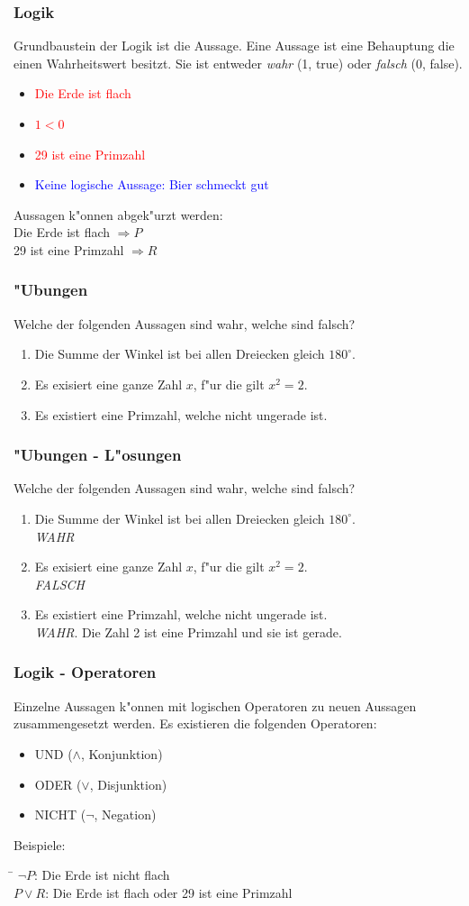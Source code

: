 \documentclass{beamer}
\begin{document}
\frame
{
	\frametitle{Logik}
	Grundbaustein der Logik ist die Aussage. Eine Aussage ist eine Behauptung die einen
	Wahrheitswert besitzt. Sie ist entweder \emph{wahr} (1, true) oder \emph{falsch} (0, false).
	\begin{itemize}
	\item \textcolor{red}{Die Erde ist flach} 
	\item \textcolor{red}{$1 < 0$}
	\item \textcolor{red}{29 ist eine Primzahl}
    \item \textcolor{blue}{Keine logische Aussage: Bier schmeckt gut}
	\end{itemize}
	\vspace{3mm}
	Aussagen k"onnen abgek"urzt werden:\\
	Die Erde ist flach $\Rightarrow P$\\
	29 ist eine Primzahl $\Rightarrow R$
}

\frame
{
	\frametitle{"Ubungen}
	Welche der folgenden Aussagen sind wahr, welche sind falsch?
	\begin{enumerate}
	\item Die Summe der Winkel ist bei allen Dreiecken gleich $180^\circ$.
	\item Es exisiert eine ganze Zahl $x$, f"ur die gilt $x^2 = 2$.
	\item Es existiert eine Primzahl, welche nicht ungerade ist.
	\end{enumerate}
}

\frame
{
	\frametitle{"Ubungen - L"osungen}
	Welche der folgenden Aussagen sind wahr, welche sind falsch?
	\begin{enumerate}
	\item Die Summe der Winkel ist bei allen Dreiecken gleich $180^\circ$.\\
	\emph{WAHR}
	\item Es exisiert eine ganze Zahl $x$, f"ur die gilt $x^2 = 2$.\\
	\emph{FALSCH}
	\item Es existiert eine Primzahl, welche nicht ungerade ist.\\
	\emph{WAHR}. Die Zahl 2 ist eine Primzahl und sie ist gerade.
	\end{enumerate}
}

\frame
{
	\frametitle{Logik - Operatoren}
	Einzelne Aussagen k"onnen mit logischen Operatoren zu neuen Aussagen zusammengesetzt
	werden. Es existieren die folgenden Operatoren:
	\begin{itemize}
	\item UND ($\land$, Konjunktion)
	\item ODER ($\lor$, Disjunktion)
	\item NICHT ($\lnot$, Negation)
	\end{itemize}
	\vspace{3mm}
	Beispiele:\\
	\begin{tabbing}
	\hspace{2cm} \= \kill
	$\lnot P$: \> Die Erde ist nicht flach\\
	$P \lor R$: \> Die Erde ist flach oder 29 ist eine Primzahl
	\end{tabbing}
}
\end{document}
